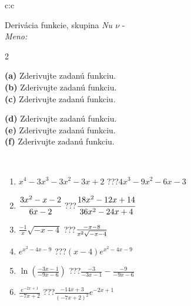 \documentclass[10pt]{report}
\begin{document}
\newpage
\thispagestyle{empty}
\begin{tabular}{c:c}
\begin{minipage}[c][104.5mm][t]{0.5\linewidth}
\begin{center}
\vspace{7mm}
{\huge Derivácia funkcie, skupina \textit{Nu $\nu$} -}\\[5mm]
\textit{Meno:}\phantom{xxxxxxxxxxxxxxxxxxxxxxxxxxxxxxxxxxxxxxxxxxxxxxxxxxxxxxxxxxxxxxxxx}\\[5mm]
\begin{minipage}{0.95\linewidth}
\begin{center}
{\small \begin{multicols}{2} \raggedright
\textbf{(a)} Zderivujte zadanú funkciu. \\[1mm]
\textbf{(b)} Zderivujte zadanú funkciu. \\[1mm]
\textbf{(c)} Zderivujte zadanú funkciu. \par \columnbreak
\textbf{(d)} Zderivujte zadanú funkciu. \\[1mm]
\textbf{(e)} Zderivujte zadanú funkciu. \\[1mm]
\textbf{(f)} Zderivujte zadanú funkciu.
\end{multicols}
}
\end{center}
\end{minipage}
\\[4mm]
\begin{minipage}{0.79\linewidth}
\begin{center}
\begin{varwidth}{\linewidth}
\begin{enumerate}
\normalsize
\item $x^4-3x^3-3x^2-3x+2$\quad \dotfill\; ???\;\dotfill \quad $4x^3-9x^2-6x-3$
\item $\cfrac{3x^2-x-2}{6x-2}$\quad \dotfill\; ???\;\dotfill \quad $\cfrac{18x^2-12x+14}{36x^2-24x+4}$
\item $\frac{-1}{x}\sqrt{-x-4}$\quad \dotfill\; ???\;\dotfill \quad $\frac{-x-8}{x^2 \sqrt{\smash[b]{-x-4}}}$
\item $e^{x^2-4x-9}$\quad \dotfill\; ???\;\dotfill \quad $(x-4)e^{x^2-4x-9}$
\item $\ln{\left(\frac{-3x-1}{-9x-6}\right)}$\quad \dotfill\; ???\;\dotfill \quad $\frac{-3}{-3x-1}-\frac{-9}{-9x-6}$
\item $\frac{e^{-2x+1}}{-7x+2}$\quad \dotfill\; ???\;\dotfill \quad $\frac{-14x+3}{(-7x+2)^2}e^{-2x+1}$
\end{enumerate}

\end{varwidth}
\end{center}
\end{minipage}
\end{center}
\end{minipage}
\end{tabular}
\end{document}
